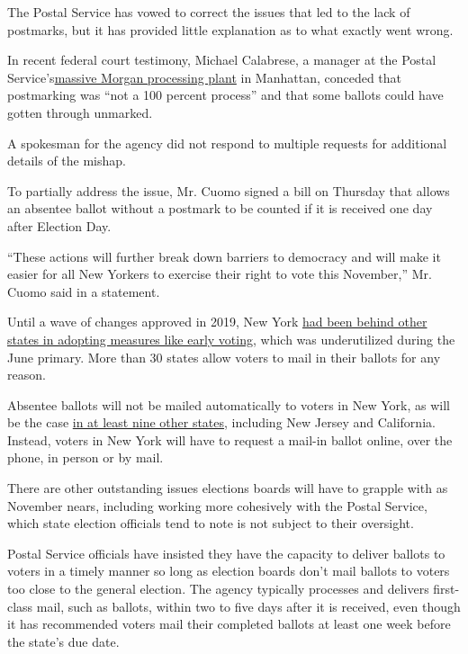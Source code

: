 The Postal Service has vowed to correct the issues that led to the lack
of postmarks, but it has provided little explanation as to what exactly
went wrong.

In recent federal court testimony, Michael Calabrese, a manager at the
Postal
Service's\href{https://www.uspsoig.gov/document/new-york-morgan-processing-and-distribution-center-efficiency}{massive
Morgan processing plant} in Manhattan, conceded that postmarking was
``not a 100 percent process'' and that some ballots could have gotten
through unmarked.

A spokesman for the agency did not respond to multiple requests for
additional details of the mishap.

To partially address the issue, Mr. Cuomo signed a bill on Thursday that
allows an absentee ballot without a postmark to be counted if it is
received one day after Election Day.

``These actions will further break down barriers to democracy and will
make it easier for all New Yorkers to exercise their right to vote this
November,'' Mr. Cuomo said in a statement.

Until a wave of changes approved in 2019, New York
\href{https://www.nytimes3xbfgragh.onion/2019/01/10/nyregion/voting-reform-election-ny.html}{had
been behind other states in adopting measures like early voting}, which
was underutilized during the June primary. More than 30 states allow
voters to mail in their ballots for any reason.

Absentee ballots will not be mailed automatically to voters in New York,
as will be the case
\href{https://www.wsj.com/articles/how-to-vote-by-mail-in-every-state-11597840923}{in
at least nine other states}, including New Jersey and California.
Instead, voters in New York will have to request a mail-in ballot
online, over the phone, in person or by mail.

There are other outstanding issues elections boards will have to grapple
with as November nears, including working more cohesively with the
Postal Service, which state election officials tend to note is not
subject to their oversight.

Postal Service officials have insisted they have the capacity to deliver
ballots to voters in a timely manner so long as election boards don't
mail ballots to voters too close to the general election. The agency
typically processes and delivers first-class mail, such as ballots,
within two to five days after it is received, even though it has
recommended voters mail their completed ballots at least one week before
the state's due date.

